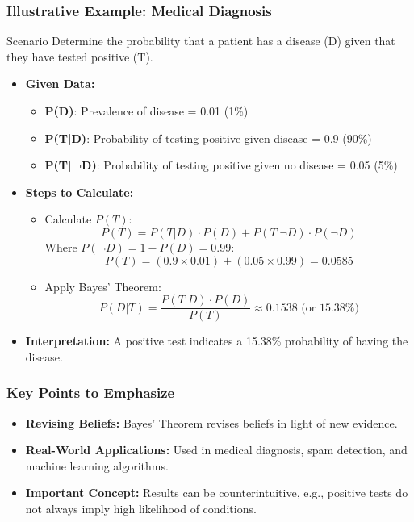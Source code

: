 \documentclass[aspectratio=169]{beamer}
\begin{document}
\begin{frame}[fragile]
    \frametitle{Illustrative Example: Medical Diagnosis}
    \begin{block}{Scenario}
        Determine the probability that a patient has a disease (D) given that they have tested positive (T).
    \end{block}
    
    \begin{itemize}
        \item \textbf{Given Data:}
            \begin{itemize}
                \item \textbf{P(D)}: Prevalence of disease = 0.01 (1\%)
                \item \textbf{P(T|D)}: Probability of testing positive given disease = 0.9 (90\%)
                \item \textbf{P(T|¬D)}: Probability of testing positive given no disease = 0.05 (5\%)
            \end{itemize}
        \item \textbf{Steps to Calculate:}
            \begin{itemize}
                \item Calculate \(P(T)\):
                    \[
                    P(T) = P(T|D) \cdot P(D) + P(T|¬D) \cdot P(¬D)
                    \]
                    Where \(P(¬D) = 1 - P(D) = 0.99\):
                    \[
                    P(T) = (0.9 \times 0.01) + (0.05 \times 0.99) = 0.0585
                    \]
                \item Apply Bayes' Theorem:
                    \[
                    P(D|T) = \frac{P(T|D) \cdot P(D)}{P(T)} \approx 0.1538 \text{ (or 15.38\%)}
                    \]
            \end{itemize}
        \item \textbf{Interpretation:} A positive test indicates a 15.38\% probability of having the disease.
    \end{itemize}
\end{frame}

\begin{frame}[fragile]
    \frametitle{Key Points to Emphasize}
    \begin{itemize}
        \item \textbf{Revising Beliefs:} Bayes' Theorem revises beliefs in light of new evidence.
        \item \textbf{Real-World Applications:} Used in medical diagnosis, spam detection, and machine learning algorithms.
        \item \textbf{Important Concept:} Results can be counterintuitive, e.g., positive tests do not always imply high likelihood of conditions.
    \end{itemize}
\end{frame}
\end{document}
